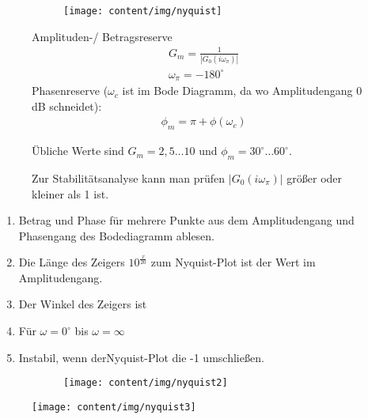 \begin{tcolorbox}[colback=white!10!white,colframe=green!30!black,title=Nyquist] 
\begin{figure}[H]
	\begin{subfigure}{0.5\linewidth}
		\texttt{[image: content/img/nyquist]}
		\label{fig:nyquist}
	\end{subfigure}
	\begin{minipage}{0.45\linewidth}
		Amplituden-/ Betragsreserve 
		\begin{align*}
			&G_m = \frac{1}{|G_0(i\omega_\pi)|}\\
			& \omega_\pi = -180^{\circ}
		\end{align*}
		Phasenreserve ($\omega_c$ ist im Bode Diagramm, da wo Amplitudengang $0$dB schneidet):
		\begin{align*}
			&\phi_m = \pi + \phi(\omega_c)
		\end{align*}
		
	\end{minipage}
	Übliche Werte sind $G_m = 2,5 \ldots  10$ und $\phi_m = 30^{\circ} \dots 60^{\circ}  $. 
	
	Zur Stabilitätsanalyse kann man prüfen $|G_0(i\omega_\pi)| $ größer oder kleiner als 1 ist. 
\end{figure}
 	\tcblower
 	\begin{enumerate}
		\item Betrag und Phase für mehrere Punkte aus dem Amplitudengang und Phasengang des Bodediagramm ablesen. 
		\item Die Länge des Zeigers $10^{\frac{x}{20}}$ zum Nyquist-Plot ist der Wert im Amplitudengang.
		\item Der Winkel des Zeigers ist 
		\item Für $\omega = 0^{\circ}$ bis $\omega = \infty$
		\item Instabil, wenn derNyquist-Plot  die -1  umschließen.
 	\end{enumerate}
 	
 \begin{figure}[H]
 	\begin{subfigure}{0.5\linewidth}
 		\texttt{[image: content/img/nyquist2]}
 	\end{subfigure}
 	\begin{minipage}{0.45\linewidth}
 		\texttt{[image: content/img/nyquist3]} 	
 	\end{minipage}
 
 \end{figure}
\end{tcolorbox}


